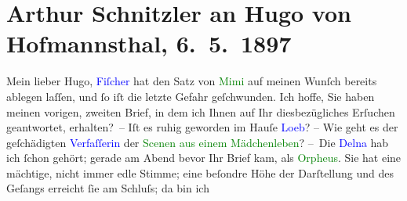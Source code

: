 

               \section[Arthur Schnitzler an Hugo von Hofmannsthal, 6. 5. 1897]{ Arthur Schnitzler an Hugo von Hofmannsthal, 6. 5. 1897}\nopagebreak{}\rehead{ }\normalsize\beginnumbering{} \toendnotes[C]{\smallbreak\pagebreak[2]} 
\toendnotes[C]{\smallbreak}\pstart
           \noindent{}{\pb}Mein lieber Hugo, \textcolor{blue}{Fiſcher}{}\ledrightnote{\textcolor{blue}{Samuel Fischer}} hat den Satz von \textcolor{green}{Mimi}{}\ledrightnote{\textcolor{green}{Mimi}} auf meinen Wunſch bereits ablegen laſſen, und ſo iſt die
               letzte Gefahr geſchwunden. Ich hoffe, Sie haben meinen vorigen, zweiten Brief, in dem
               ich Ihnen auf Ihr diesbezügliches Erſuchen geantwortet, erhalten? – Iſt es ruhig
               geworden im Hauſe \textcolor{blue}{Loeb}{}\ledrightnote{\textcolor{blue}{Regina Loeb}{\newline}\textcolor{blue}{Louis Loeb}}? – Wie geht es der
               geſchädigten \textcolor{blue}{Verfaſſerin}{} der
                  \textcolor{green}{Scenen aus einem
               Mädchenleben}{}?\pend
           \pstart
           – Die \textcolor{blue}{Delna}{}\ledrightnote{\textcolor{blue}{Marie Delna}} hab ich ſchon gehört; gerade am Abend
               bevor Ihr Brief kam, als \textcolor{green}{Orpheus}{}.
               Sie hat eine {\pb}mächtige, nicht immer edle Stimme; eine
               beſondre Höhe der Darſtellung und des Geſangs erreicht ſie am Schluſs; da bin ich
